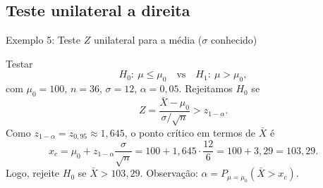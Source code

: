 \documentclass[12pt]{beamer}
\begin{document}
%		
%

\subsection{Teste unilateral a direita}
\begin{frame}{Exemplo 5: Teste $Z$ unilateral para a média ($\sigma$ conhecido)}
	\begin{block}{}
		\justifying
		Testar
		\[
		H_0:\ \mu \le \mu_0 \quad \text{vs} \quad H_1:\ \mu > \mu_0,
		\]
		com $\mu_0=100$, $n=36$, $\sigma=12$, $\alpha=0{,}05$. Rejeitamos $H_0$ se
		\[
		Z=\frac{\bar X-\mu_0}{\sigma/\sqrt{n}} > z_{1-\alpha}.
		\]
		Como $z_{1-\alpha}=z_{0{,}95}\approx 1{,}645$, o ponto crítico em termos de $\bar X$ é
		\[
		x_c=\mu_0+z_{1-\alpha}\frac{\sigma}{\sqrt{n}}
		=100+1{,}645\cdot\frac{12}{6}
		=100+3{,}29
		=103{,}29.
		\]
		Logo, rejeite $H_0$ se $\bar X>103{,}29$. Observação: $\alpha=P_{\mu=\mu_0}(\bar X>x_c)$.
	\end{block}
\end{frame}
\end{document}
